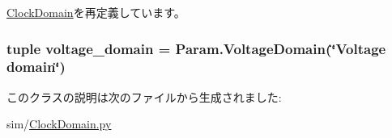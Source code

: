 \hyperlink{classClockDomain_1_1ClockDomain_acce15679d830831b0bbe8ebc2a60b2ca}{ClockDomain}を再定義しています。\hypertarget{classClockDomain_1_1SrcClockDomain_a8dcad321029dbe3573c158112be45c8c}{
\subsubsection[{voltage\_\-domain}]{\setlength{\rightskip}{0pt plus 5cm}tuple {\bf voltage\_\-domain} = Param.VoltageDomain(\char`\"{}Voltage domain\char`\"{})}}
\label{classClockDomain_1_1SrcClockDomain_a8dcad321029dbe3573c158112be45c8c}


このクラスの説明は次のファイルから生成されました:\begin{DoxyCompactItemize}
\item 
sim/\hyperlink{ClockDomain_8py}{ClockDomain.py}\end{DoxyCompactItemize}
